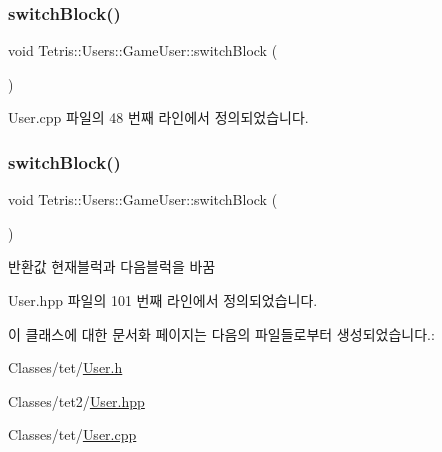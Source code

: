 \mbox{\label{class_tetris_1_1_users_1_1_game_user_a1d1efa857420c82248fd12da9c08ef77}} 
\subsubsection{\texorpdfstring{switch\+Block()}{switchBlock()}\hspace{0.1cm}{\footnotesize\ttfamily [1/2]}}
{\footnotesize\ttfamily void Tetris\+::\+Users\+::\+Game\+User\+::switch\+Block (\begin{DoxyParamCaption}{ }\end{DoxyParamCaption})}



User.\+cpp 파일의 48 번째 라인에서 정의되었습니다.

\mbox{\label{class_tetris_1_1_users_1_1_game_user_a1d1efa857420c82248fd12da9c08ef77}} 
\subsubsection{\texorpdfstring{switch\+Block()}{switchBlock()}\hspace{0.1cm}{\footnotesize\ttfamily [2/2]}}
{\footnotesize\ttfamily void Tetris\+::\+Users\+::\+Game\+User\+::switch\+Block (\begin{DoxyParamCaption}{ }\end{DoxyParamCaption})\hspace{0.3cm}{\ttfamily [inline]}}

\begin{DoxyReturn}{반환값}
현재블럭과 다음블럭을 바꿈 
\end{DoxyReturn}


User.\+hpp 파일의 101 번째 라인에서 정의되었습니다.



이 클래스에 대한 문서화 페이지는 다음의 파일들로부터 생성되었습니다.\+:\begin{DoxyCompactItemize}
\item 
Classes/tet/\hyperlink{_user_8h}{User.\+h}\item 
Classes/tet2/\hyperlink{_user_8hpp}{User.\+hpp}\item 
Classes/tet/\hyperlink{_user_8cpp}{User.\+cpp}\end{DoxyCompactItemize}
